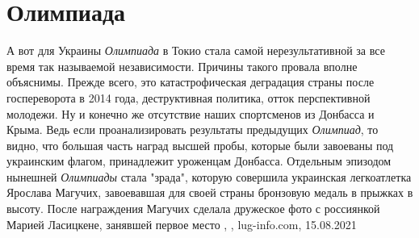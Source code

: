  
 
 
 
 
\chapter{Олимпиада}

А вот для Украины \emph{Олимпиада} в Токио стала самой нерезультативной за все время
так называемой независимости. Причины такого провала вполне объяснимы. Прежде
всего, это катастрофическая деградация страны после госпереворота в 2014 года,
деструктивная политика, отток перспективной молодежи. Ну и конечно же
отсутствие наших спортсменов из Донбасса и Крыма. Ведь если проанализировать
результаты предыдущих \emph{Олимпиад}, то видно, что большая часть наград высшей
пробы, которые были завоеваны под украинским флагом, принадлежит уроженцам
Донбасса.  Отдельным эпизодом нынешней \emph{Олимпиады} стала "зрада", которую
совершила украинская легкоатлетка Ярослава Магучих, завоевавшая для своей
страны бронзовую медаль в прыжках в высоту. После награждения Магучих сделала
дружеское фото с россиянкой Марией Ласицкене, занявшей первое место
, 
, lug-info.com, 15.08.2021
